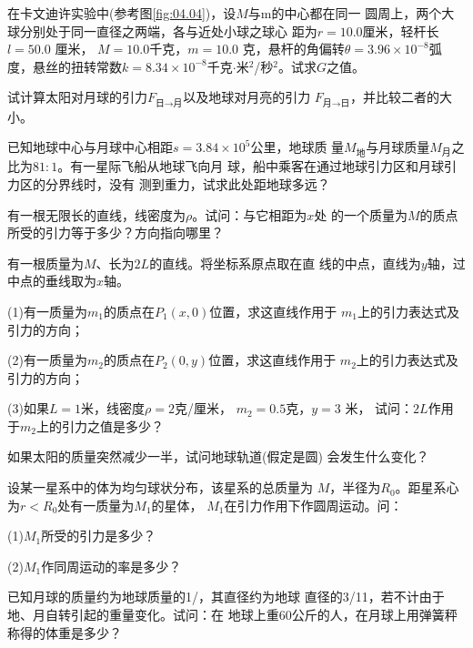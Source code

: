 \begin{exercises}

\exercise 在卡文迪许实验中(参考图\ref{fig:04.04})，设$ M $与$  $m的中心都在同一
圆周上，两个大球分别处于同一直径之两端，各与近处小球之球心
距为$  r = 1 0 . 0   $厘米，轻杆长$  l = 5 0 . 0  $ 厘米， $ M = 1 0 . 0  $千克，$  m = 1 0 . 0  $
克，悬杆的角偏转$  \theta = 3 . 9 6 \times 1 0 ^ { - 8 }  $弧度，悬丝的扭转常数$  k = 8 . 3 4
\times 1 0 ^ { - 8 }  $千克$ \cdot $米$ ^2 $/秒$ ^2 $。试求$ G $之值。

\exercise 试计算太阳对月球的引力$ F _ {\text{日}\to\text{月}} $以及地球对月亮的引力
$ F _ {\text{月}\to\text{日}} $，并比较二者的大小。

\exercise 已知地球中心与月球中心相距$  s = 3 . 8 4 \times 1 0 ^ 5 $公里，地球质
量$ M _ {\text{地}} $与月球质量$ M _ {\text{月}}$之比为$ 81:1 $。有一星际飞船从地球飞向月
球，船中乘客在通过地球引力区和月球引力区的分界线时，没有
测到重力，试求此处距地球多远？

\exercise 有一根无限长的直线，线密度为$ \rho $。试问：与它相距为$ x $处
的一个质量为$ M $的质点所受的引力等于多少？方向指向哪里？

\exercise 有一根质量为$ M $、长为$ 2L $的直线。将坐标系原点取在直
线的中点，直线为$ y $轴，过中点的垂线取为$ x $轴。

(1)有一质量为$  m _ { 1 }   $的质点在$  P _ { 1 } \left( x, 0 \right)   $位置，求这直线作用于
$  m _ { 1 }   $上的引力表达式及引力的方向；

(2)有一质量为$  m _ { 2 }   $的质点在$  P _ { 2 } \left( 0, y \right)   $位置，求这直线作用于
$  m _ { 2 }   $上的引力表达式及引力的方向；

(3)如果$  L = 1   $米，线密度$  \rho = 2  $克/厘米， $ m _ { 2 } = 0 . 5   $克，$ y = 3  $ 米，
试问：$ 2L $作用于$  m _ { 2 }   $上的引力之值是多少？

\exercise 如果太阳的质量突然减少一半，试问地球轨道(假定是圆)
会发生什么变化？

\exercise 设某一星系中的体为均匀球状分布，该星系的总质量为
$ M $，半径为$  R _ { 0 } $。距星系心为$  r < R _ { 0 }   $处有一质量为$ M _ 1 $的星体，
$ M _ 1 $在引力作用下作圆周运动。问：

(1)$  M _  1    $所受的引力是多少？

(2)$ M _ 1 $作同周运动的率是多少？

\exercise 已知月球的质量约为地球质量的1/，其直径约为地球
直径的3/11，若不计由于地、月自转引起的重量变化。试问：在
地球上重60公斤的人，在月球上用弹簧秤称得的体重是多少？


\end{exercises}

